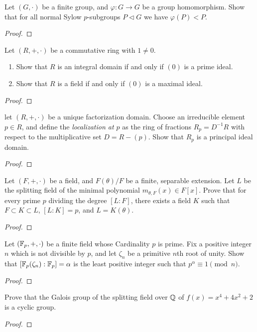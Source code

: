 \begin{problem}
Let $(G,\cdot)$ be a finite group, and $\varphi\colon G\to G$ be a group
homomorphism. Show that for all normal Sylow $p$-subgroups $P\lhd G$ we
have $\varphi(P)<P$.
\end{problem}
\begin{proof}

\end{proof}

\begin{problem}
Let $(R,+,\cdot)$ be a commutative ring with $1\neq 0$.
\begin{enumerate}[noitemsep,label=(\alph*)]
\item Show that $R$ is an integral domain if and only if $(0)$ is a prime
  ideal.
\item Show that $R$ is a field if and only if $(0)$ is a maximal ideal.
\end{enumerate}
\end{problem}
\begin{proof}
\end{proof}

\begin{problem}
let $(R,+,\cdot)$ be a unique factorization domain. Choose an irreducible
element $p\in R$, and define the \emph{localization at $p$} as the ring of
fractions $R_p=D^{-1}R$ with respect to the multiplicative set
$D=R-(p)$. Show that $R_p$ is a principal ideal domain.
\end{problem}
\begin{proof}
\end{proof}

\begin{problem}
Let $(F,+,\cdot)$ be a field, and $F(\theta)/F$ be a finite, separable
extension. Let $L$ be the splitting field of the minimal polynomial
$m_{\theta,F}(x)\in F[x]$. Prove that for every prime $p$ dividing the
degree $[L:F]$, there exists a field $K$ such that $F\subset K\subset L$,
$[L:K]=p$, and $L=K(\theta)$.
\end{problem}
\begin{proof}
\end{proof}

\begin{problem}
Let $(\mathbb{F}_p,+,\cdot)$ be a finite field whose Cardinality $p$ is
prime. Fix a positive integer $n$ which is not divisible by $p$, and let
$\zeta_n$ be a primitive $n$th root of unity. Show that
$\left[\mathbb{F}_p(\zeta_n):\mathbb{F}_p\right]=\alpha$  is the least positive integer
such that $p^\alpha\equiv 1\pmod{n}$.
\end{problem}
\begin{proof}
\end{proof}

\begin{problem}
Prove that the Galois group of the splitting field over $\mathbb{Q}$ of
$f(x)=x^4+4x^2+2$ is a cyclic group.
\end{problem}
\begin{proof}
\end{proof}

